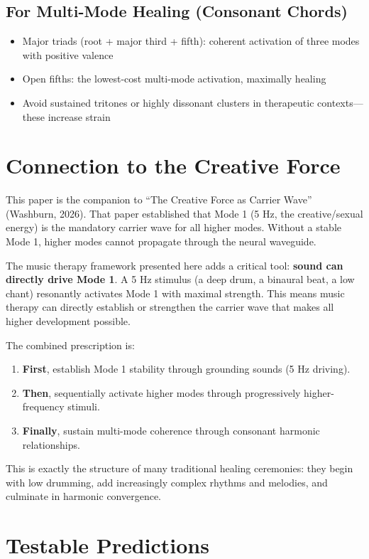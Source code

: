 \documentclass[11pt,a4paper]{article}
\begin{document}
\subsection{For Multi-Mode Healing (Consonant Chords)}
\begin{itemize}
    \item Major triads (root + major third + fifth): coherent activation of three modes with positive valence
    \item Open fifths: the lowest-cost multi-mode activation, maximally healing
    \item Avoid sustained tritones or highly dissonant clusters in therapeutic contexts---these increase strain
\end{itemize}

\section{Connection to the Creative Force}

This paper is the companion to ``The Creative Force as Carrier Wave'' (Washburn, 2026). That paper established that Mode 1 (5 Hz, the creative/sexual energy) is the mandatory carrier wave for all higher modes. Without a stable Mode 1, higher modes cannot propagate through the neural waveguide.

The music therapy framework presented here adds a critical tool: \textbf{sound can directly drive Mode 1}. A 5 Hz stimulus (a deep drum, a binaural beat, a low chant) resonantly activates Mode 1 with maximal strength. This means music therapy can directly establish or strengthen the carrier wave that makes all higher development possible.

The combined prescription is:
\begin{enumerate}
    \item \textbf{First}, establish Mode 1 stability through grounding sounds (5 Hz driving).
    \item \textbf{Then}, sequentially activate higher modes through progressively higher-frequency stimuli.
    \item \textbf{Finally}, sustain multi-mode coherence through consonant harmonic relationships.
\end{enumerate}

This is exactly the structure of many traditional healing ceremonies: they begin with low drumming, add increasingly complex rhythms and melodies, and culminate in harmonic convergence.

\section{Testable Predictions}
\end{document}
